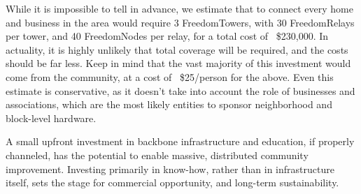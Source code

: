 While it is impossible to tell in advance, we
estimate that to connect every home and business in
the area would require 3 FreedomTowers, with 30 FreedomRelays per tower, and 40
FreedomNodes per relay, for a total cost of ~\$230,000. In actuality, it is
highly unlikely that total coverage will be required, and the costs should be
far less. Keep in mind that the vast majority of this investment would come from
the community, at a cost of ~\$25/person for the above. Even this estimate is conservative, as
it doesn't take into account the role of businesses and associations, which are
the most likely entities to sponsor neighborhood and block-level hardware. \par

A small upfront investment in backbone infrastructure and education, if properly
channeled, has the potential to enable massive, distributed community
improvement. Investing  primarily in know-how, rather than in infrastructure
itself, sets the stage for commercial opportunity, and long-term sustainability.

